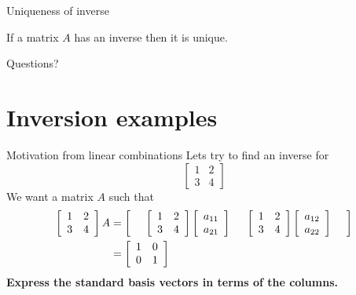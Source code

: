 \documentclass{beamer}
\begin{document}
\begin{frame}{Uniqueness of inverse}
  \begin{lemma}
    If a matrix $A$ has an inverse then it is unique.
  \end{lemma}
\end{frame}

\begin{frame}
  Questions?
\end{frame}

\section{Inversion examples}
\label{sec:Inversion-algorithm}

\begin{frame}{Motivation from linear combinations}
  Lets try to find an inverse for
  \begin{equation*}
    \left[
      \begin{array}{cc}
        1&2\\
        3&4
      \end{array}
    \right]
  \end{equation*}
  We want a matrix $A$ such that
  \begin{align*}
    \left[
      \begin{array}{cc}
        1&2\\
        3&4
      \end{array}
    \right]A& =
    \left[
      \hspace{0.5cm}
      \left[
      \begin{array}{cc}
        1&2\\
        3&4
      \end{array}
      \right]
      \left[
        \begin{array}{c}
          a_{11}\\
          a_{21}
        \end{array}
      \right]
      \hspace{0.5cm}
      \left[
        \begin{array}{cc}
          1&2\\
          3&4
        \end{array}
      \right]
      \left[
        \begin{array}{c}
          a_{12}\\
          a_{22}
        \end{array}
      \right]
      \hspace{0.5cm}
    \right]\\
    &= \left[
      \begin{array}{cc}
        1&0\\
        0&1
      \end{array}
    \right]
  \end{align*}
\bf{Express the standard basis vectors in terms of the columns.}
\end{frame}
\end{document}

